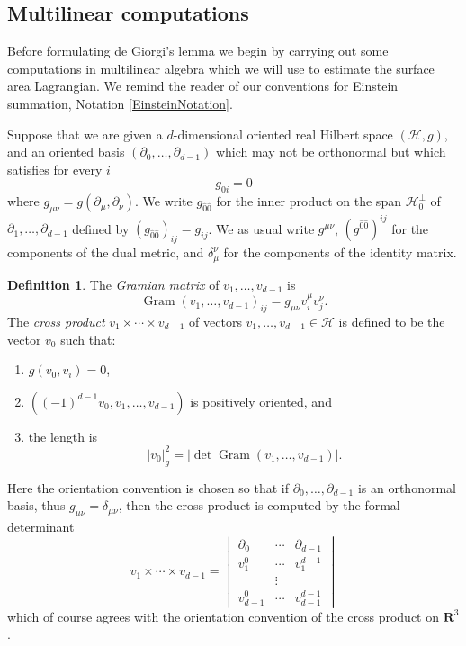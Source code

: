 \documentclass[reqno,12pt,letterpaper]{amsart}
\newcommand{\RR}{\mathbf{R}}
\DeclareMathOperator{\Gram}{Gram}
\newcommand{\Hilb}{\mathcal H}
\newcommand{\dfn}[1]{\emph{#1}\index{#1}}
\theoremstyle{definition}
\newtheorem{definition}[theorem]{Definition}
\numberwithin{equation}{section}
\begin{document}
\subsection{Multilinear computations}
Before formulating de Giorgi's lemma we begin by carrying out some computations in multilinear algebra which we will use to estimate the surface area Lagrangian.
We remind the reader of our conventions for Einstein summation, Notation \ref{EinsteinNotation}.

Suppose that we are given a $d$-dimensional oriented real Hilbert space $(\Hilb, g)$, and an oriented basis $(\partial_0, \dots, \partial_{d - 1})$ which may not be orthonormal but which satisfies for every $i$
\begin{equation}\label{0th coordinate orthogonal}
g_{0i} = 0
\end{equation}
where $g_{\mu\nu} = g(\partial_\mu, \partial_\nu)$.
We write $g_{\hat 0 \hat 0}$ for the inner product on the span $\Hilb_0^\perp$ of $\partial_1, \dots, \partial_{d - 1}$ defined by $(g_{\hat 0 \hat 0})_{ij} = g_{ij}$.
We as usual write $g^{\mu\nu}$, $(g^{\hat 0 \hat 0})^{ij}$ for the components of the dual metric, and $\delta_\mu^\nu$ for the components of the identity matrix.

\begin{definition}
The \dfn{Gramian matrix} of $v_1, \dots, v_{d - 1}$ is
$$\Gram(v_1, \dots, v_{d - 1})_{ij} = g_{\mu \nu} v_i^\mu v_j^\nu.$$
The \dfn{cross product} $v_1 \times \cdots \times v_{d - 1}$ of vectors $v_1, \dots, v_{d - 1} \in \Hilb$ is defined to be the vector $v_0$
such that:
\begin{enumerate}
\item $g(v_0, v_i) = 0$,
\item $((-1)^{d - 1} v_0, v_1, \dots, v_{d - 1})$ is positively oriented, and
\item the length is
$$|v_0|_g^2 = |\det \Gram(v_1, \dots, v_{d - 1})|.$$
\end{enumerate}
\end{definition}

Here the orientation convention is chosen so that if $\partial_0, \dots, \partial_{d - 1}$ is an orthonormal basis, thus $g_{\mu\nu} = \delta_{\mu\nu}$, then the cross product is computed by the formal determinant
\begin{equation}\label{formal determinant}
v_1 \times \cdots \times v_{d - 1} = \begin{vmatrix}\partial_0 & \cdots & \partial_{d - 1} \\
v_1^0 & \cdots & v_1^{d - 1}\\
& \vdots \\
v_{d - 1}^0 & \cdots & v_{d - 1}^{d - 1}\end{vmatrix}
\end{equation}
which of course agrees with the orientation convention of the cross product on $\RR^3$.
\end{document}
